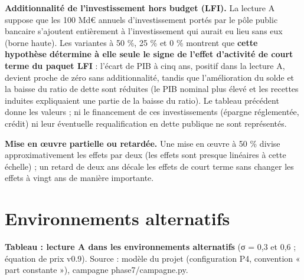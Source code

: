 \documentclass[
  11pt,
  11pt,
  a4paper,
  openany]{book}
\begin{document}
\textbf{Additionnalité de l'investissement hors budget (LFI).} La
lecture A suppose que les 100 Md€ annuels d'investissement portés par le
pôle public bancaire s'ajoutent entièrement à l'investissement qui
aurait eu lieu sans eux (borne haute). Les variantes à 50 \%, 25 \% et 0
\% montrent que \textbf{cette hypothèse détermine à elle seule le signe
de l'effet d'activité de court terme du paquet LFI} : l'écart de PIB à
cinq ans, positif dans la lecture A, devient proche de zéro sans
additionnalité, tandis que l'amélioration du solde et la baisse du ratio
de dette sont réduites (le PIB nominal plus élevé et les recettes
induites expliquaient une partie de la baisse du ratio). Le tableau
précédent donne les valeurs ; ni le financement de ces investissements
(épargne réglementée, crédit) ni leur éventuelle requalification en
dette publique ne sont représentés.

\textbf{Mise en œuvre partielle ou retardée.} Une mise en œuvre à 50 \%
divise approximativement les effets par deux (les effets sont presque
linéaires à cette échelle) ; un retard de deux ans décale les effets de
court terme sans changer les effets à vingt ans de manière importante.

\hypertarget{sec:effets-environnements}{%
\section{Environnements alternatifs}\label{sec:effets-environnements}}

\textbf{Tableau : lecture A dans les environnements alternatifs} (σ =
0,3 et 0,6 ; équation de prix v0.9). Source : modèle du projet
(configuration P4, convention « part constante »), campagne
phase7/campagne.py.
\end{document}
